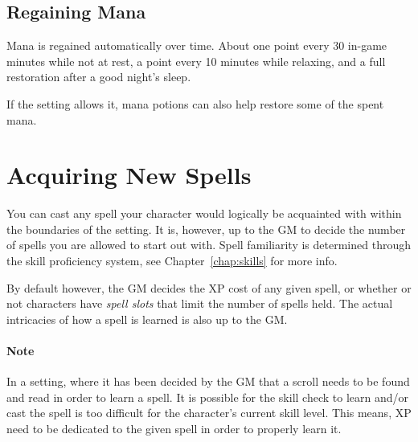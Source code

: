 \subsection{Regaining Mana}
Mana is regained automatically over time.
About one point every 30 in-game minutes while not at rest,
a point every 10 minutes while relaxing,
and a full restoration after a good night's sleep.

If the setting allows it, mana potions can also help restore some of the spent mana.

\section{Acquiring New Spells}
You can cast any spell your character would logically be acquainted with within the boundaries of the setting.
It is, however, up to the GM to decide the number of spells you are allowed to start out with.
Spell familiarity is determined through the skill proficiency system, see Chapter~\ref{chap:skills} for more info.

By default however, the GM decides the XP cost of any given spell, or whether or not characters have \textit{spell slots} that limit the number of spells held. 
The actual intricacies of how a spell is learned is also up to the GM.

\paragraph{Note} In a setting, where it has been decided by the GM that a scroll needs to be found and read in order to learn a spell.
It is possible for the skill check to learn and/or cast the spell is too difficult for the character's current skill level.
This means, XP need to be dedicated to the given spell in order to properly learn it.